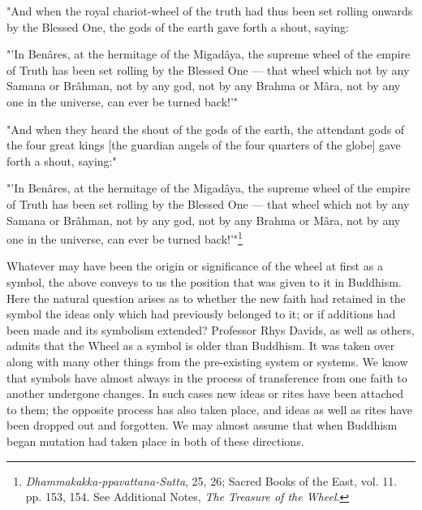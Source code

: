 \documentclass[a4paper, 11pt, oneside, polutonikogreek, english]{article}
\begin{document}
"And when the royal chariot-wheel of the truth had thus been set rolling onwards by the Blessed One, the gods of the earth gave forth a shout, saying:

"'In Benâres, at the hermitage of the Migadâya, the supreme wheel of the empire of Truth has been set rolling by the Blessed One --- that wheel which not by any Samana or Brâhman, not by any god, not by any Brahma or Mâra, not by any one in the universe, can ever be turned back!'"

"And when they heard the shout of the gods of the earth, the attendant gods of the four great kings [the guardian angels of the four quarters of the globe] gave forth a shout, saying:"

"'In Benâres, at the hermitage of the Migadâya, the supreme wheel of the empire of Truth has been set rolling by the Blessed One --- that wheel which not by any Samana or Brâhman, not by any god, not by any Brahma or Mâra, not by any one in the universe, can ever be turned back!'"\footnote{\emph{Dhammakakka-ppavattana-Sutta}, 25, 26; Sacred Books of the East, vol. 11. pp. 153, 154. See Additional Notes, \emph{The Treasure of the Wheel}.}

Whatever may have been the origin or significance of the wheel at first as a symbol, the above conveys to us the position that was given to it in Buddhism. Here the natural question arises as to whether the new faith had retained in the symbol the ideas only which had previously belonged to it; or if additions had been made and its symbolism extended? Professor Rhys Davids, as well as others, admits that the Wheel as a symbol is older than Buddhism. It was taken over along with many other things from the pre-existing system or systems. We know that symbols have almost always in the process of transference from one faith to another undergone changes. In such cases new ideas or rites have been attached to them; the opposite process has also taken place, and ideas as well as rites have been dropped out and forgotten. We may almost assume that when Buddhism began mutation had taken place in both of these directions.
\end{document}
